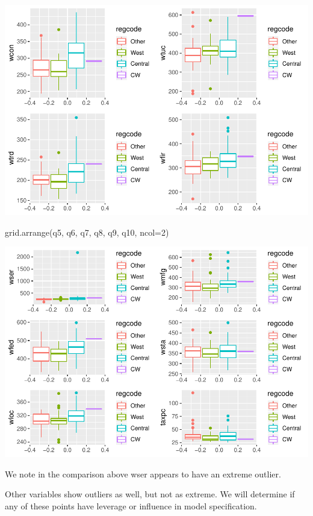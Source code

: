 \documentclass[]{article}
\newenvironment{Shaded}{}{}
\newcommand{\DataTypeTok}[1]{#1}
\newcommand{\DecValTok}[1]{#1}
\newcommand{\KeywordTok}[1]{\textcolor[rgb]{0.00,0.00,1.00}{#1}}
\newcommand{\NormalTok}[1]{#1}
\begin{document}
\includegraphics{Bagnard_Gaustad_Hartman_Leung_Lab_3_files/figure-latex/unnamed-chunk-15-1.pdf}

\begin{Shaded}
\begin{Highlighting}[]
\KeywordTok{grid.arrange}\NormalTok{(q5, q6, q7, q8, q9, q10, }\DataTypeTok{ncol=}\DecValTok{2}\NormalTok{)}
\end{Highlighting}
\end{Shaded}

\includegraphics{Bagnard_Gaustad_Hartman_Leung_Lab_3_files/figure-latex/unnamed-chunk-15-2.pdf}

We note in the comparison above wser appears to have an extreme outlier.

Other variables show outliers as well, but not as extreme. We will
determine if any of these points have leverage or influence in model
specification.
\end{document}

